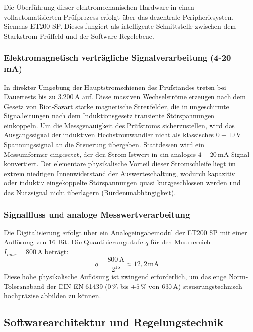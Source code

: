 Die Überführung dieser elektromechanischen Hardware in einen vollautomatisierten Prüfprozess erfolgt über das dezentrale Peripheriesystem Siemens ET200 SP. Dieses fungiert als intelligente Schnittstelle zwischen dem Starkstrom-Prüffeld und der Software-Regelebene.
\subsubsection{Elektromagnetisch verträgliche Signalverarbeitung (4-20 mA)}
In direkter Umgebung der Hauptstromschienen des Prüfstandes treten bei Dauertests bis zu $3.200\,\text{A}$ auf. Diese massiven Wechselströme erzeugen nach dem Gesetz von Biot-Savart starke magnetische Streufelder, die in ungeschirmte Signalleitungen nach dem Induktionsgesetz transiente Störspannungen einkoppeln. 
Um die Messgenauigkeit des Prüfstroms sicherzustellen, wird das Ausgangssignal der induktiven Hochstromwandler nicht als klassisches $0-10\,\text{V}$ Spannungssignal an die Steuerung übergeben. Stattdessen wird ein Messumformer eingesetzt, der den Strom-Istwert in ein analoges $4-20\,\text{mA}$ Signal konvertiert. Der elementare physikalische Vorteil dieser Stromschleife liegt im extrem niedrigen Innenwiderstand der Auswerteschaltung, wodurch kapazitiv oder induktiv eingekoppelte Störspannungen quasi kurzgeschlossen werden und das Nutzsignal nicht überlagern (Bürdenunabhängigkeit).
\subsubsection{Signalfluss und analoge Messwertverarbeitung}
Die Digitalisierung erfolgt über ein Analogeingabemodul der ET200 SP mit einer Auflösung von 16 Bit. Die Quantisierungsstufe $q$ für den Messbereich $I_{max} = 800\,\text{A}$ beträgt:
\begin{equation}
    q = \frac{800\,\text{A}}{2^{16}} \approx 12,2\,\text{mA}
\end{equation}
Diese hohe physikalische Auflösung ist zwingend erforderlich, um das enge Norm-Toleranzband der DIN EN 61439 ($0\,\%$ bis $+5\,\%$ von 630\,A) steuerungstechnisch hochpräzise abbilden zu können.

\subsection{Softwarearchitektur und Regelungstechnik}
\label{sec:software_regelung}


